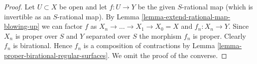 \documentclass{stacks-project}
\theoremstyle{plain}
\theoremstyle{definition}
\theoremstyle{remark}
\numberwithin{equation}{subsection}
\begin{document}
\begin{proof}
Let $U \subset X$ be open and let $f : U \to Y$ be the given
$S$-rational map (which is invertible as an $S$-rational map).
By Lemma \ref{lemma-extend-rational-map-blowing-up}
we can factor $f$ as $X_n \to \ldots \to X_1 \to X_0 = X$
and $f_n : X_n \to Y$. Since $X_n$ is proper over $S$ and
$Y$ separated over $S$ the morphism $f_n$ is proper.
Clearly $f_n$ is birational. Hence $f_n$ is a composition
of contractions by Lemma \ref{lemma-proper-birational-regular-surfaces}.
We omit the proof of the converse.
\end{proof}










\end{document}
